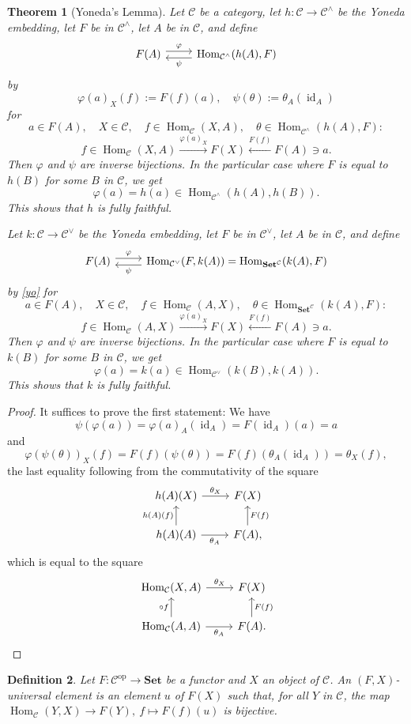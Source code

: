 \documentclass[12pt]{article}%
\newtheorem{thm}{Theorem}%
\newtheorem{df}[thm]{Definition}%
\theoremstyle{remark}
\theoremstyle{definition}
\newcommand{\C}{\mathcal C}
\newcommand{\Set}{\mathbf{Set}}%
\newcommand{\pp}{\varphi}
\newcommand{\xr}{\xrightarrow}
\DeclareMathOperator{\id}{id}
\DeclareMathOperator{\Hom}{Hom}%
\DeclareMathOperator{\op}{op}
\begin{document}
\begin{thm}[Yoneda's Lemma]\label{yol}
Let $\C$ be a category, let $h:\C\to\C^\wedge$ be the Yoneda embedding, let $F$ be in $\C^\wedge$, let $A$ be in $\C$, and define 
$$
\begin{tikzcd} 
F(A)\ar[yshift=0.7ex]{r}{\pp}&\Hom_{\C^\wedge}(h(A),F)\ar[yshift=-0.7ex]{l}{\psi}
\end{tikzcd}
$$
by 
\begin{equation}\label{yo}
\pp(a)_X(f):=F(f)(a),\quad\psi(\theta):=\theta_A(\id_A)
\end{equation}
for 
$$
a\in F(A),\quad X\in\C,\quad f\in\Hom_\C(X,A),\quad\theta\in\Hom_{\C^\wedge}(h(A),F):
$$ 
$$
f\in\Hom_\C(X,A)\xr{\pp(a)_X}F(X)\xleftarrow{F(f)}F(A)\ni a.
$$
Then $\pp$ and $\psi$ are inverse bijections. In the particular case where $F$ is equal to $h(B)$ for some $B$ in $\C$, we get 
$$
\pp(a)=h(a)\in\Hom_{\C^\wedge}(h(A),h(B)).
$$
This shows that $h$ is fully faithful.

Let $k:\C\to\C^\vee$ be the Yoneda embedding, let $F$ be in $\C^\vee$, let $A$ be in $\C$, and define 
$$
\begin{tikzcd} 
F(A)\ar[yshift=0.7ex]{r}{\pp}&\Hom_{\C^\vee}(F,k(A))=\Hom_{\Set^\C}(k(A),F)\ar[yshift=-0.7ex]{l}{\psi}
\end{tikzcd}
$$
by \eqref{yo} for 
$$
a\in F(A),\quad X\in\C,\quad f\in\Hom_\C(A,X),\quad\theta\in\Hom_{\Set^\C}(k(A),F):
$$ 
$$
f\in\Hom_\C(A,X)\xr{\pp(a)_X}F(X)\xleftarrow{F(f)}F(A)\ni a.
$$
Then $\pp$ and $\psi$ are inverse bijections. In the particular case where $F$ is equal to $k(B)$ for some $B$ in $\C$, we get 
$$
\pp(a)=k(a)\in\Hom_{\C^\vee}(k(B),k(A)).
$$
This shows that $k$ is fully faithful.
\end{thm}
%
\begin{proof}
It suffices to prove the first statement: We have 
$$
\psi(\pp(a))=\pp(a)_A(\id_A)=F(\id_A)(a)=a
$$ 
and
$$
\pp(\psi(\theta))_X(f)=F(f)(\psi(\theta))=F(f)(\theta_A(\id_A))=\theta_X(f),
$$ 
the last equality following from the commutativity of the square 
$$
\begin{tikzcd}
h(A)(X)\ar{r}{\theta_X}&F(X)\\ 
h(A)(A)\ar{u}{h(A)(f)}\ar{r}[swap]{\theta_A}&F(A),\ar{u}[swap]{F(f)}
\end{tikzcd}
$$ 
which is equal to the square 
$$
\begin{tikzcd}
\Hom_\C(X,A)\ar{r}{\theta_X}&F(X)\\ 
\Hom_\C(A,A)\ar{u}{\circ f}\ar{r}[swap]{\theta_A}&F(A).\ar{u}[swap]{F(f)}
\end{tikzcd}
$$
\end{proof}
%
\begin{df}\label{ue} 
Let $F:\C^{\op}\to\Set$ be a functor and $X$ an object of $\C$. An $(F,X)$\--{\em universal element}  is an element $u$ of $F(X)$ such that, for all $Y$ in $\C$, the map $\Hom_\C(Y,X)\to F(Y),\ f\mapsto F(f)(u)$ is bijective. 
\end{df}
\end{document}
